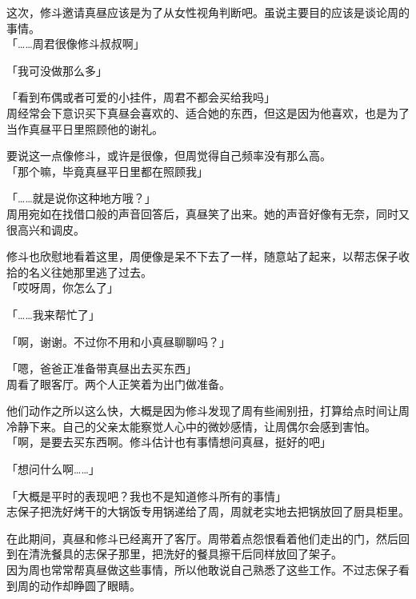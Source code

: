 这次，修斗邀请真昼应该是为了从女性视角判断吧。虽说主要目的应该是谈论周的事情。\\

「……周君很像修斗叔叔啊」

「我可没做那么多」

「看到布偶或者可爱的小挂件，周君不都会买给我吗」\\

周经常会下意识买下真昼会喜欢的、适合她的东西，但这是因为他喜欢，也是为了当作真昼平日里照顾他的谢礼。

要说这一点像修斗，或许是很像，但周觉得自己频率没有那么高。\\

「那个嘛，毕竟真昼平日里都在照顾我」

「……就是说你这种地方哦？」\\

周用宛如在找借口般的声音回答后，真昼笑了出来。她的声音好像有无奈，同时又很高兴和调皮。

修斗也欣慰地看着这里，周便像是呆不下去了一样，随意站了起来，以帮志保子收拾的名义往她那里逃了过去。\\

「哎呀周，你怎么了」

「……我来帮忙了」

「啊，谢谢。不过你不用和小真昼聊聊吗？」

「嗯，爸爸正准备带真昼出去买东西」\\

周看了眼客厅。两个人正笑着为出门做准备。

他们动作之所以这么快，大概是因为修斗发现了周有些闹别扭，打算给点时间让周冷静下来。自己的父亲太能察觉人心中的微妙感情，让周偶尔会感到害怕。\\

「啊，是要去买东西啊。修斗估计也有事情想问真昼，挺好的吧」

「想问什么啊……」

「大概是平时的表现吧？我也不是知道修斗所有的事情」\\

志保子把洗好烤干的大锅饭专用锅递给了周，周就老实地去把锅放回了厨具柜里。

在此期间，真昼和修斗已经离开了客厅。周带着点怨恨看着他们走出的门，然后回到在清洗餐具的志保子那里，把洗好的餐具擦干后同样放回了架子。\\

因为周也常常帮真昼做这些事情，所以他敢说自己熟悉了这些工作。不过志保子看到周的动作却睁圆了眼睛。\\

